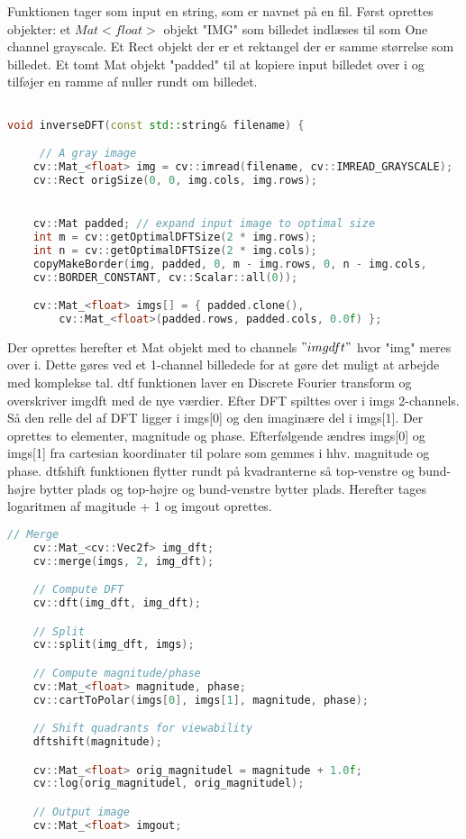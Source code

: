 \documentclass{article}
\begin{document}
Funktionen tager som input en string, som er navnet på en fil. Først oprettes objekter: et $Mat <float>$ objekt "IMG" som billedet indlæses til som One channel grayscale. Et Rect objekt der er et rektangel der er samme størrelse som billedet. Et tomt Mat objekt "padded" til at kopiere input billedet over i og tilføjer en ramme af nuller rundt om billedet. \newline 
\begin{lstlisting}[language=c++] 

void inverseDFT(const std::string& filename) { 

     // A gray image 
    cv::Mat_<float> img = cv::imread(filename, cv::IMREAD_GRAYSCALE); 
    cv::Rect origSize(0, 0, img.cols, img.rows); 


    cv::Mat padded; // expand input image to optimal size 
    int m = cv::getOptimalDFTSize(2 * img.rows); 
    int n = cv::getOptimalDFTSize(2 * img.cols);  
    copyMakeBorder(img, padded, 0, m - img.rows, 0, n - img.cols, 
    cv::BORDER_CONSTANT, cv::Scalar::all(0)); 

    cv::Mat_<float> imgs[] = { padded.clone(), 
        cv::Mat_<float>(padded.rows, padded.cols, 0.0f) }; 

\end{lstlisting} 
Der oprettes herefter et Mat objekt med to channels $"img dft"$ hvor "img" meres over i. Dette gøres ved et 1-channel billedede for at gøre det muligt at arbejde med komplekse tal. \newline 
dtf funktionen laver en Discrete Fourier transform og overskriver imgdft med de nye værdier. \newline 
Efter DFT spilttes over i imgs 2-channels. Så den relle del af DFT ligger i imgs[0] og den imaginære del i imgs[1]. \newline 
Der oprettes to elementer, magnitude og phase. Efterfølgende ændres imgs[0] og imgs[1] fra cartesian koordinater til polare som gemmes i hhv. magnitude og phase. \newline 
dtfshift funktionen flytter rundt på kvadranterne så top-venstre og bund-højre bytter plads og top-højre og bund-venstre bytter plads. \newline 
Herefter tages logaritmen af magitude + 1 og imgout oprettes. \newline 

\begin{lstlisting}[language=c++] 
    // Merge 
    cv::Mat_<cv::Vec2f> img_dft; 
    cv::merge(imgs, 2, img_dft); 

    // Compute DFT 
    cv::dft(img_dft, img_dft); 

    // Split 
    cv::split(img_dft, imgs); 

    // Compute magnitude/phase 
    cv::Mat_<float> magnitude, phase; 
    cv::cartToPolar(imgs[0], imgs[1], magnitude, phase); 

    // Shift quadrants for viewability 
    dftshift(magnitude); 

    cv::Mat_<float> orig_magnitudel = magnitude + 1.0f; 
    cv::log(orig_magnitudel, orig_magnitudel); 

    // Output image 
    cv::Mat_<float> imgout; 
\end{lstlisting} 
\end{document}
